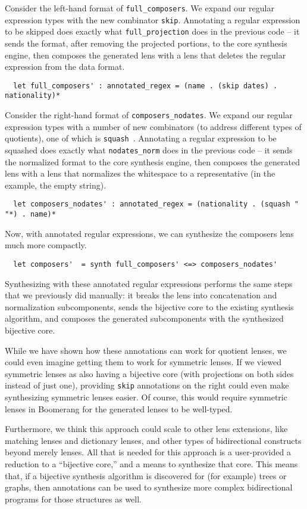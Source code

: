 \documentclass[a4paper]{article}
\begin{document}
Consider the left-hand format of \lstinline{full_composers}. We expand our
regular expression types with the new combinator \lstinline{skip}. Annotating a
regular expression to be skipped does exactly what \lstinline{full_projection}
does in the previous code -- it sends the format, after removing the projected
portions, to the core synthesis engine, then composes the generated lens with a
lens that deletes the regular expression from the data format.
%
\begin{lstlisting}
  let full_composers' : annotated_regex = (name . (skip dates) . nationality)*
\end{lstlisting}
%

Consider the right-hand format of \lstinline{composers_nodates}. We expand our
regular expression types with a number of new combinators (to address different
types of quotients), one of which is
\lstinline{squash}~\cite{maina+:quotient-synthesis}. Annotating a regular
expression to be squashed does exactly what \lstinline{nodates_norm} does in the
previous code -- it sends the normalized format to the core synthesis engine,
then composes the generated lens with a lens that normalizes the whitespace to a
representative (in the example, the empty string).
%
\begin{lstlisting}
  let composers_nodates' : annotated_regex = (nationality . (squash " "*) . name)*
\end{lstlisting}
%

Now, with annotated regular expressions, we can synthesize the composers lens much
more compactly.
%
\begin{lstlisting}
  let composers'  = synth full_composers' <=> composers_nodates'
\end{lstlisting}
%
Synthesizing with these annotated regular expressions performs the same steps
that we previously did manually: it breaks the lens into concatenation and
normalization subcomponents, sends the bijective core to the existing synthesis
algorithm, and composes the generated subcomponents with the synthesized
bijective core.

While we have shown how these annotations can work for quotient lenses, we could
even imagine getting them to work for symmetric lenses. If we viewed symmetric
lenses as also having a bijective core (with projections on both sides instead
of just one), providing \lstinline{skip} annotations on the right could even
make synthesizing symmetric lenses easier. Of course, this would require
symmetric lenses in Boomerang for the generated lenses to be well-typed.

Furthermore, we think this approach could scale to other lens extensions, like
matching lenses and dictionary lenses, and other types of bidirectional
constructs beyond merely lenses. All that is needed for this approach is a
user-provided a reduction to a ``bijective core,'' and a means to synthesize
that core. This means that, if a bijective synthesis algorithm is discovered for
(for example) trees or graphs, then annotations can be used to synthesize more
complex bidirectional programs for those structures as well.

 

\end{document}
